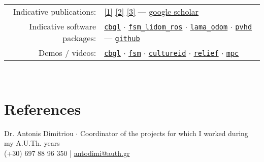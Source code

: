\documentclass[a4paper,10pt,twoside]{article}
\begin{document}
\begin{tabular}{rp{12cm}}
  Indicative publications: &
\href{https://ieeexplore.ieee.org/abstract/document/9981228}{[1]}
\href{https://www.sciencedirect.com/science/article/abs/pii/S0921889021002323}{[2]}
\href{https://www.tandfonline.com/doi/full/10.1080/00207179.2018.1514129}{[3]} --- \href{https://scholar.google.com/citations?view\_op=list\_works\&hl=en\&user=9\_hI4hMAAAAJ}{google scholar}\\

  Indicative software packages: &
\href{https://github.com/li9i/cbgl}{\texttt{cbgl}} $\cdot$
\href{https://github.com/li9i/fsm\_lidom\_ros}{\texttt{fsm\_lidom\_ros}} $\cdot$
\href{https://github.com/li9i/lama\_odom}{\texttt{lama\_odom}} $\cdot$
\href{https://github.com/li9i/pandora\_vision\_2014/tree/hydro-devel/pandora\_vision\_hole\_detector}{\texttt{pvhd}} --- \href{https://github.com/li9i}{\texttt{github}}\\

  Demos / videos: & \href{https://www.youtube.com/watch?v=xaDKjI0WkDc}{\texttt{cbgl}} $\cdot$ \href{https://www.youtube.com/watch?v=hB4qsHCEXGI}{\texttt{fsm}} $\cdot$ \href{https://cultureid.web.auth.gr/?page\_id=200&lang=en}{\texttt{cultureid}} $\cdot$ \href{https://relief.web.auth.gr/}{\texttt{relief}} $\cdot$ \href{https://www.youtube.com/watch?v=937OZez1iN8}{\texttt{mpc}}
\end{tabular}
\\

\section{References}
\noindent Dr. Antonis Dimitriou $\cdot$ Coordinator of the projects for which I worked during my A.U.Th. years \\
  (+30) 697 88 96 350 | \href{mailto:antodimi@auth.gr}{antodimi@auth.gr} \\



\end{document}
